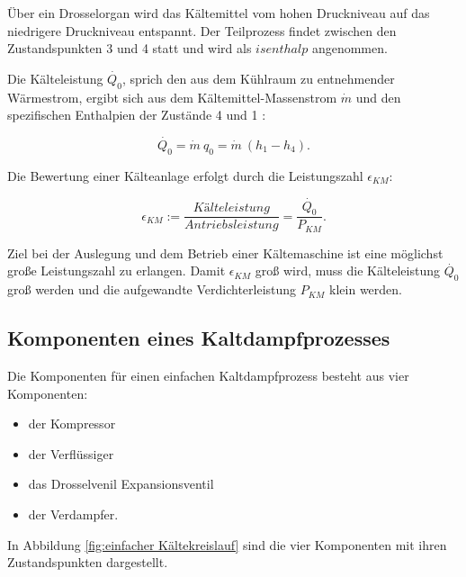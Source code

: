 Über ein Drosselorgan wird das Kältemittel vom hohen Druckniveau auf das niedrigere Druckniveau entspannt. Der Teilprozess findet zwischen den Zustandspunkten 3 und 4 statt und wird als $isenthalp$ angenommen.  
 
Die Kälteleistung $\dot{Q_0}$, sprich den aus dem Kühlraum zu entnehmender Wärmestrom, ergibt sich aus dem Kältemittel-Massenstrom $\dot{m}$ und den spezifischen Enthalpien der Zustände 4 und 1 :

\begin{equation}
	\dot{Q_0} = \dot{m}~ q_0 = \dot{m}~ (h_1 - h_4).
	\label{eq:Kälteleistung}
\end{equation}




Die Bewertung einer Kälteanlage erfolgt durch die Leistungszahl $\epsilon_{KM}$: 

\begin{equation}
	\epsilon_{KM} := \frac{Kälteleistung}{Antriebsleistung} =\frac{\dot{Q_0}}{P_{KM}}.
	\label{eq:Leistungszahl}
\end{equation}

Ziel bei der Auslegung und dem Betrieb einer Kältemaschine ist eine möglichst große Leistungszahl zu erlangen. Damit $\epsilon_{KM}$ groß wird, muss die Kälteleistung $\dot{Q_0}$ groß werden und die aufgewandte Verdichterleistung $P_{KM}$ klein werden. 


\subsection{Komponenten eines Kaltdampfprozesses}
\label{subsec:Komponenten eines Kaltdampfprozesses}

Die Komponenten für einen einfachen Kaltdampfprozess  besteht aus vier Komponenten:

\begin{itemize}
\item der Kompressor
\item der Verflüssiger 
\item das Drosselvenil Expansionsventil
\item der Verdampfer. 
\end{itemize}

In Abbildung \ref{fig:einfacher Kältekreislauf} sind die vier Komponenten mit ihren Zustandspunkten dargestellt.

